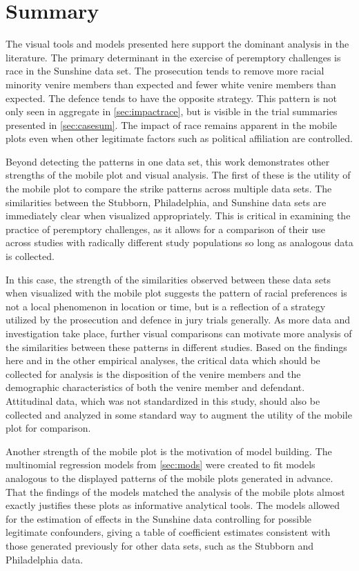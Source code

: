 \chapter{Summary}
\label{c:summary}

The visual tools and models presented here support the dominant analysis in the literature. The primary determinant in the
exercise of peremptory challenges is race in the Sunshine data set. The prosecution tends to remove more racial minority venire
members than expected and fewer white venire members than expected. The defence tends to have the
opposite strategy. This pattern is not only seen in aggregate in \ref{sec:impactrace}, but is visible in the trial summaries
presented in \ref{sec:casesum}. The impact of race remains apparent in the mobile plots even when other legitimate factors
such as political affiliation are controlled.

Beyond detecting the patterns in one data set, this work demonstrates other strengths of the mobile plot and visual
analysis. The first of these is the utility of the mobile plot to compare the strike patterns across multiple data sets. The
similarities between the Stubborn, Philadelphia, and Sunshine data sets are immediately clear when visualized appropriately. This
is critical in examining the practice of peremptory challenges, as it allows for a comparison of their use across studies with
radically different study populations so long as analogous data is collected.

In this case, the strength of the similarities observed between these data sets when visualized with the mobile plot suggests the
pattern of racial preferences is not a local phenomenon in location or time, but is a reflection of a strategy utilized by the
prosecution and defence in jury trials generally. As more data and investigation take place, further visual comparisons can
motivate more analysis of the similarities between these patterns in different studies. Based on the findings here and in the
other empirical analyses, the critical data which should be collected for analysis is the disposition of the venire members and
the demographic characteristics of both the venire member and defendant. Attitudinal data, which was not standardized in this
study, should also be collected and analyzed in some standard way to augment the utility of the mobile plot for comparison.

Another strength of the mobile plot is the motivation of model building. The multinomial regression models from \ref{sec:mods}
were created to fit models analogous to the displayed patterns of the mobile plots generated in advance. That the findings of the
models matched the analysis of the mobile plots almost exactly justifies these plots as informative analytical tools. The models
allowed for the estimation of effects in the Sunshine data controlling for possible legitimate confounders, giving a table of
coefficient estimates consistent with those generated previously for other data sets, such as the Stubborn and Philadelphia data.

